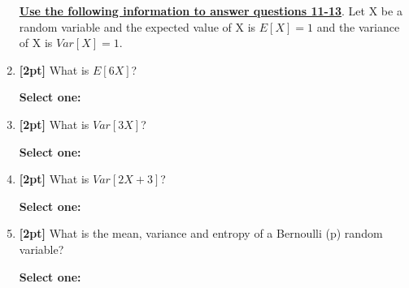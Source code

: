 \documentclass[12pt]{article}
\renewcommand{\circle}{\tikz\draw[black] (0,0) circle (1ex);}
\begin{document}
\begin{enumerate}
    \bigskip\bigskip\bigskip
    \textbf{\underline{Use the following information to answer questions 11-13}}. Let X be a random variable and the expected value of X is $E[X] = 1$ and the variance of X is $Var[X] = 1$. 

    \item \textbf{[2pt]} What is $E[6X]$?

    \textbf{Select one:}


    \item \textbf{[2pt]} What is $Var[3X]$?

    \textbf{Select one:}


    \item \textbf{[2pt]} What is $Var[2X + 3]$?

    \textbf{Select one:}


\clearpage
    \item \textbf{[2pt]} What is the mean, variance and entropy of a Bernoulli (p) random variable?
    
    \textbf{Select one:}
    


\end{enumerate}
\end{document}

